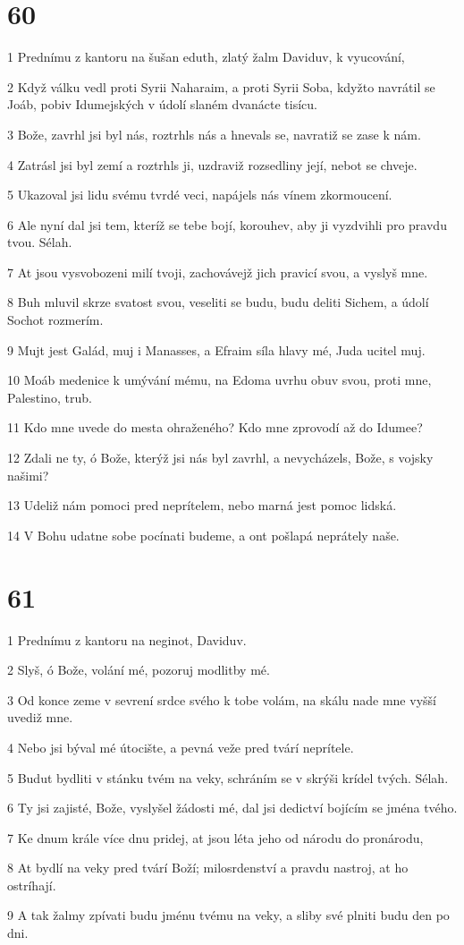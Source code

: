 \chapter{60}

\par 1 Prednímu z kantoru na šušan eduth, zlatý žalm Daviduv, k vyucování,
\par 2 Když válku vedl proti Syrii Naharaim, a proti Syrii Soba, kdyžto navrátil se Joáb, pobiv Idumejských v údolí slaném dvanácte tisícu.
\par 3 Bože, zavrhl jsi byl nás, roztrhls nás a hnevals se, navratiž se zase k nám.
\par 4 Zatrásl jsi byl zemí a roztrhls ji, uzdraviž rozsedliny její, nebot se chveje.
\par 5 Ukazoval jsi lidu svému tvrdé veci, napájels nás vínem zkormoucení.
\par 6 Ale nyní dal jsi tem, kteríž se tebe bojí, korouhev, aby ji vyzdvihli pro pravdu tvou. Sélah.
\par 7 At jsou vysvobozeni milí tvoji, zachovávejž jich pravicí svou, a vyslyš mne.
\par 8 Buh mluvil skrze svatost svou, veseliti se budu, budu deliti Sichem, a údolí Sochot rozmerím.
\par 9 Mujt jest Galád, muj i Manasses, a Efraim síla hlavy mé, Juda ucitel muj.
\par 10 Moáb medenice k umývání mému, na Edoma uvrhu obuv svou, proti mne, Palestino, trub.
\par 11 Kdo mne uvede do mesta ohraženého? Kdo mne zprovodí až do Idumee?
\par 12 Zdali ne ty, ó Bože, kterýž jsi nás byl zavrhl, a nevycházels, Bože, s vojsky našimi?
\par 13 Udeliž nám pomoci pred neprítelem, nebo marná jest pomoc lidská.
\par 14 V Bohu udatne sobe pocínati budeme, a ont pošlapá neprátely naše.

\chapter{61}

\par 1 Prednímu z kantoru na neginot, Daviduv.
\par 2 Slyš, ó Bože, volání mé, pozoruj modlitby mé.
\par 3 Od konce zeme v sevrení srdce svého k tobe volám, na skálu nade mne vyšší uvediž mne.
\par 4 Nebo jsi býval mé útocište, a pevná veže pred tvárí neprítele.
\par 5 Budut bydliti v stánku tvém na veky, schráním se v skrýši krídel tvých. Sélah.
\par 6 Ty jsi zajisté, Bože, vyslyšel žádosti mé, dal jsi dedictví bojícím se jména tvého.
\par 7 Ke dnum krále více dnu pridej, at jsou léta jeho od národu do pronárodu,
\par 8 At bydlí na veky pred tvárí Boží; milosrdenství a pravdu nastroj, at ho ostríhají.
\par 9 A tak žalmy zpívati budu jménu tvému na veky, a sliby své plniti budu den po dni.

